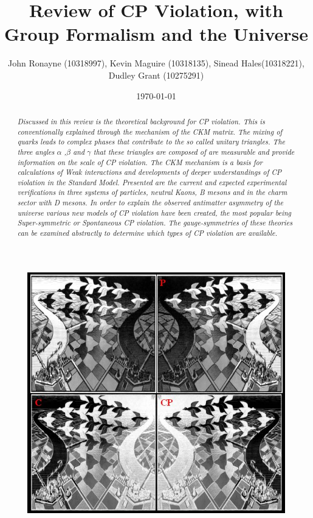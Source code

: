 \documentclass[floatfix,aps,prd,amsmath,amssymb]{revtex4}
\begin{document}
\title{Review of CP Violation, with Group Formalism and the Universe}
\author{John Ronayne (10318997), Kevin Maguire (10318135), Sinead Hales(10318221), Dudley Grant (10275291)}
\date{\today}

\begin{abstract}
\textit{Discussed in this review is the theoretical background for CP violation. This is conventionally explained through the mechanism of the CKM matrix. The mixing of quarks leads to complex phases that contribute to the so called unitary triangles. The three angles $\alpha$ ,$\beta$ and $\gamma$ that these triangles are composed of are measurable and provide information on the scale of CP violation. The CKM mechanism is a basis for calculations of Weak interactions and developments of deeper understandings of CP violation in the Standard Model. Presented are the current and expected experimental verifications in three systems of particles, neutral Kaons, B mesons and in the charm sector with D mesons. In order to explain the observed antimatter asymmetry of the universe various new models of CP violation have been created, the most popular being Super-symmetric or Spontaneous CP violation. The gauge-symmetries of these theories can be examined abstractly to determine which types of CP violation are available.}
\end{abstract}

\maketitle
{}

\begin{figure}[h!]
\begin{center}
\includegraphics[scale=0.8]{figs/Cover.jpg}
\end{center}
\end{figure}
\end{document}
